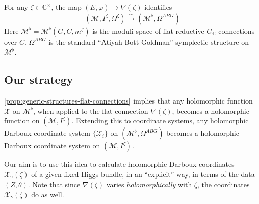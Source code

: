 \documentclass[12pt,letterpaper,reqno]{article}
\numberwithin{equation}{section}
\newcommand{\cM}{\ensuremath{\mathcal M}}
\newcommand{\cX}{\ensuremath{\mathcal X}}
\newcommand{\R}{\ensuremath{\mathbb R}}
\newcommand{\bbC}{\ensuremath{\mathbb C}}
\newcommand{\I}{{\mathrm i}}
\newcommand{\simarrow}{\xrightarrow\sim}
\newcommand{\ti}[1]{\textit{#1}}
\begin{document}
\begin{prop} \label{prop:generic-structures-flat-connections} For any $\zeta \in \bbC^\times$,
the map $(E,\varphi) \to \nabla(\zeta)$ identifies
\begin{equation}
  (\cM, I^\zeta, \Omega^\zeta) \simarrow (\cM^\flat, \Omega^{ABG})
\end{equation}
Here $\cM^\flat = \cM^\flat(G, C, m^\zeta)$
is the moduli space of flat reductive 
$G_\bbC$-connections over $C$. 
$\Omega^{ABG}$ is the standard ``Atiyah-Bott-Goldman'' symplectic
structure on $\cM^\flat$.
\end{prop}


\subsection{Our strategy}

\autoref{prop:generic-structures-flat-connections} 
implies that any holomorphic function $\cX$ on $\cM^\flat$,
when applied to
the flat connection $\nabla(\zeta)$, becomes a holomorphic
function on $(\cM, I^\zeta)$.
Extending this to coordinate systems, any holomorphic 
Darboux coordinate system $\{\cX_i\}$ on $(\cM^\flat, \Omega^{ABG})$
becomes a holomorphic Darboux coordinate system on
$(\cM, I^\zeta)$.

Our aim is to use this idea to calculate holomorphic Darboux
coordinates $\cX_\gamma(\zeta)$ of a given fixed Higgs bundle,
in an ``explicit'' way,
in terms of the data $(Z, \theta)$.
Note that since $\nabla(\zeta)$ varies
\ti{holomorphically} with $\zeta$, the coordinates
$\cX_\gamma(\zeta)$ do as well.
\end{document}
